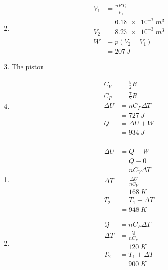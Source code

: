 \documentclass{article}
\begin{document}
\begin{enumerate}
  \setcounter{enumi}{1}
  \item

        \begin{align*}
          V_1 & = \frac{n R T_1}{p_1} \\
              & = \qty{6.18e-3}{m^3}  \\
          V_2 & = \qty{8.23e-3}{m^3}  \\
          W   & = p (V_2 - V_1)       \\
              & = \qty{207}{J}
        \end{align*}

  \item The piston

  \item

        \begin{align*}
          C_V      & = \frac{5}{2} R  \\
          C_P      & = \frac{7}{2} R  \\
          \Delta U & = n C_P \Delta T \\
                   & = \qty{727}{J}   \\
          Q        & = \Delta U + W   \\
                   & = \qty{934}{J}
        \end{align*}
\end{enumerate}

\setcounter{subsubsection}{18}
\subsubsection{}

\begin{enumerate}
  \item

        \begin{align*}
          \Delta U & = Q - W                  \\
                   & = Q - 0                  \\
                   & = n C_V \Delta T         \\
          \Delta T & = \frac{\Delta U}{n C_V} \\
                   & = \qty{168}{K}           \\
          T_2      & = T_1 + \Delta T         \\
                   & = \qty{948}{K}
        \end{align*}

  \item

        \begin{align*}
          Q        & = n C_P \Delta T  \\
          \Delta T & = \frac{Q}{n C_P} \\
                   & = \qty{120}{K}    \\
          T_2      & = T_1 + \Delta T  \\
                   & = \qty{900}{K}
        \end{align*}
\end{enumerate}
\end{document}
